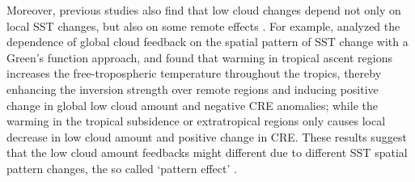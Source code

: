 
 Moreover, previous studies also find that low cloud changes depend not only on local SST changes, but also on some remote effects \citep[e.g.,][]{Zhou2015,Zhou2016,Zhou2017,Mauritsen2016clouds,Andrews2018}. For example, \cite{Zhou2017} analyzed the dependence of global cloud feedback on the spatial pattern of SST change with a Green's function approach, and found that warming in tropical ascent regions increases the free-tropospheric temperature throughout the tropics, thereby enhancing the inversion strength over remote regions and inducing positive change in global low cloud amount and negative CRE anomalies; while the warming in the tropical subsidence or extratropical regions only causes local decrease in low cloud amount and positive change in CRE. These results suggest that the low cloud amount feedbacks might different due to different SST spatial pattern changes, the so called `pattern effect' \citep[e.g.,][]{Dong2020intermodel}.

